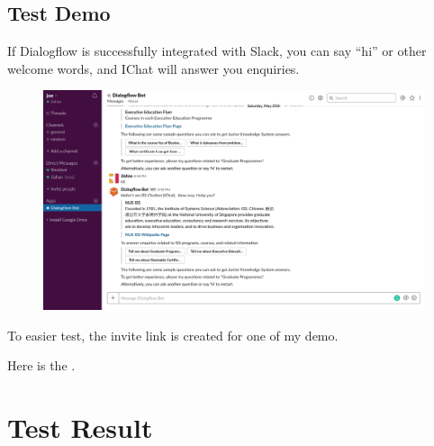 \section{Test Demo} %
\label{sec:test}

	If Dialogflow is successfully integrated with Slack, you can say “hi” or other welcome words, and IChat will answer you enquiries.

	\begin{figure}[H]
		\centering
		\includegraphics[width=\linewidth, frame]{img/manual_18.jpg}
	\end{figure}

	To easier test, the invite link is created for one of my demo.

	Here is the \href{https://join.slack.com/t/joe1122/shared_invite/enQtNjQxNTQ0MTY0Nzg1LTM3NDI3NGZjYWQzMjQ4YTJjMGIxZmQ4Y2VkMWYzNDAxOTQ0OTFlMmFjMzIzNDgyZjNkY2Q5YzQ2MjVlOTlmYWI}{}.


\chapter{Test Result} %
\label{cha:test_result}

